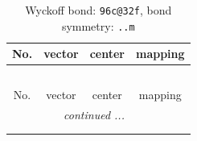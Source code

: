\documentclass[fleqn,8pt]{jsarticle}
\begin{document}
\renewcommand{\arraystretch}{1.2}
\begin{longtable}{cccc}
\caption{Wyckoff bond: {\tt 96c@32f}, bond symmetry: {\tt ..m}}
 \\
 \hline \hline
No. & vector & center & mapping \\ \hline \endfirsthead

\multicolumn{3}{l}{\tablename\ \thetable{}} \\
 \hline \hline
No. & vector & center & mapping \\ \hline \endhead

 \hline \hline
\multicolumn{3}{r}{\footnotesize\it continued ...} \\ \endfoot

 \hline \hline
\multicolumn{3}{r}{} \\ \endlastfoot


\end{longtable}
\end{document}
